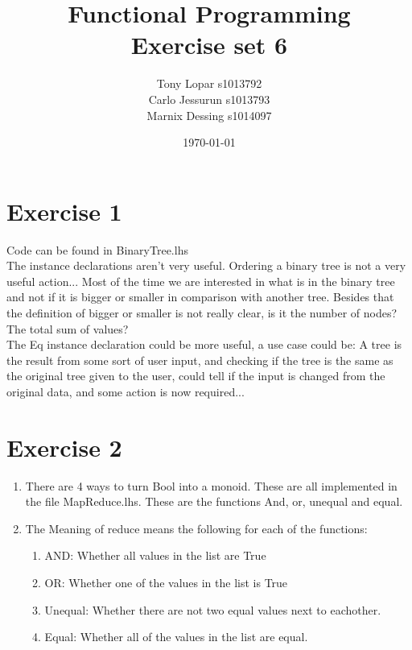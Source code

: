\documentclass{article}
\begin{document}
\title{Functional Programming \\ Exercise set 6}
\date{\today}
\author{Tony Lopar s1013792 \\ Carlo Jessurun s1013793 \\ Marnix Dessing s1014097}
\maketitle

\section*{Exercise 1}
Code can be found in BinaryTree.lhs\\
The instance declarations aren't very useful. Ordering a binary tree is not a very useful action... Most of the time we are interested in what is in the binary tree and not if it is bigger or smaller in comparison with another tree. Besides that the definition of bigger or smaller is not really clear, is it the number of nodes? The total sum of values?\\
The Eq instance declaration could be more useful, a use case could be: A tree is the result from some sort of user input, and checking if the tree is the same as the original tree given to the user, could tell if the input is changed from the original data, and some action is now required...

\section*{Exercise 2}
\begin{enumerate}
  \item There are 4 ways to turn Bool into a monoid. These are all implemented in the file MapReduce.lhs. These are the functions And, or, unequal and equal.
  \item The Meaning of reduce means the following for each of the functions:
  \begin{enumerate}[label=\roman*)]
  \item AND: Whether all values in the list are True
  \item OR: Whether one of the values in the list is True
  \item Unequal: Whether there are not two equal values next to eachother.
  \item Equal: Whether all of the values in the list are equal.
  \end{enumerate}
\end{enumerate}
\end{document}
